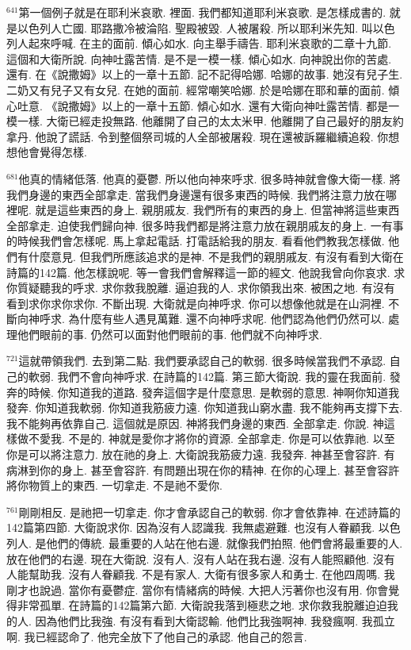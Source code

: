 \documentclass{book}
\begin{document}
$^{641}$第一個例子就是在耶利米哀歌.
裡面.
我們都知道耶利米哀歌.
是怎樣成書的.
就是以色列人亡國.
耶路撒冷被淪陷.
聖殿被毀.
人被屠殺.
所以耶利米先知.
叫以色列人起來呼喊.
在主的面前.
傾心如水.
向主舉手禱告.
耶利米哀歌的二章十九節.
這個和大衛所說.
向神吐露苦情.
是不是一模一樣.
傾心如水.
向神說出你的苦處.
還有.
在《說撒姆》以上的一章十五節.
記不記得哈娜.
哈娜的故事.
她沒有兒子生.
二奶又有兒子又有女兒.
在她的面前.
經常嘲笑哈娜.
於是哈娜在耶和華的面前.
傾心吐意.
《說撒姆》以上的一章十五節.
傾心如水.
還有大衛向神吐露苦情.
都是一模一樣.
大衛已經走投無路.
他離開了自己的太太米甲.
他離開了自己最好的朋友約拿丹.
他說了謊話.
令到整個祭司城的人全部被屠殺.
現在還被訴羅繼續追殺.
你想想他會覺得怎樣.

$^{681}$他真的情緒低落.
他真的憂鬱.
所以他向神來呼求.
很多時神就會像大衛一樣.
將我們身邊的東西全部拿走.
當我們身邊還有很多東西的時候.
我們將注意力放在哪裡呢.
就是這些東西的身上.
親朋戚友.
我們所有的東西的身上.
但當神將這些東西全部拿走.
迫使我們歸向神.
很多時我們都是將注意力放在親朋戚友的身上.
一有事的時候我們會怎樣呢.
馬上拿起電話.
打電話給我的朋友.
看看他們教我怎樣做.
他們有什麼意見.
但我們所應該追求的是神.
不是我們的親朋戚友.
有沒有看到大衛在詩篇的142篇.
他怎樣說呢.
等一會我們會解釋這一節的經文.
他說我曾向你哀求.
求你質疑聽我的呼求.
求你救我脫離.
逼迫我的人.
求你領我出來.
被困之地.
有沒有看到求你求你求你.
不斷出現.
大衛就是向神呼求.
你可以想像他就是在山洞裡.
不斷向神呼求.
為什麼有些人遇見萬難.
還不向神呼求呢.
他們認為他們仍然可以.
處理他們眼前的事.
仍然可以面對他們眼前的事.
他們就不向神呼求.

$^{721}$這就帶領我們.
去到第二點.
我們要承認自己的軟弱.
很多時候當我們不承認.
自己的軟弱.
我們不會向神呼求.
在詩篇的142篇.
第三節大衛說.
我的靈在我面前.
發奔的時候.
你知道我的道路.
發奔這個字是什麼意思.
是軟弱的意思.
神啊你知道我發奔.
你知道我軟弱.
你知道我筋疲力遠.
你知道我山窮水盡.
我不能夠再支撐下去.
我不能夠再依靠自己.
這個就是原因.
神將我們身邊的東西.
全部拿走.
你說.
神這樣做不愛我.
不是的.
神就是愛你才將你的資源.
全部拿走.
你是可以依靠祂.
以至你是可以將注意力.
放在祂的身上.
大衛說我筋疲力遠.
我發奔.
神甚至會容許.
有病淋到你的身上.
甚至會容許.
有問題出現在你的精神.
在你的心理上.
甚至會容許將你物質上的東西.
一切拿走.
不是祂不愛你.

$^{761}$剛剛相反.
是祂把一切拿走.
你才會承認自己的軟弱.
你才會依靠神.
在述詩篇的142篇第四節.
大衛說求你.
因為沒有人認識我.
我無處避難.
也沒有人眷顧我.
以色列人.
是他們的傳統.
最重要的人站在他右邊.
就像我們拍照.
他們會將最重要的人.
放在他們的右邊.
現在大衛說.
沒有人.
沒有人站在我右邊.
沒有人能照顧他.
沒有人能幫助我.
沒有人眷顧我.
不是有家人.
大衛有很多家人和勇士.
在他四周嗎.
我剛才也說過.
當你有憂鬱症.
當你有情緒病的時候.
大把人污著你也沒有用.
你會覺得非常孤單.
在詩篇的142篇第六節.
大衛說我落到極悲之地.
求你救我脫離迫迫我的人.
因為他們比我強.
有沒有看到大衛認輸.
他們比我強啊神.
我發瘋啊.
我孤立啊.
我已經認命了.
他完全放下了他自己的承認.
他自己的怨言.
\end{document}
